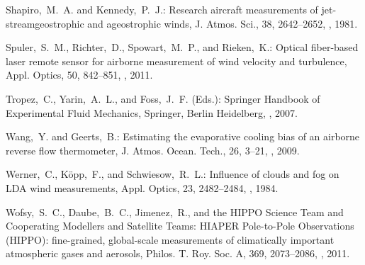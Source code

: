 \documentclass[amtd, online, hvmath]{copernicus}
\begin{document}
\begin{thebibliography}{30}
Shapiro,~M.~A. and Kennedy,~P.~J.: {Research aircraft measurements of jet-streamgeostrophic
and ageostrophic winds}, {J. Atmos. Sci.}, {38}, {2642--2652}, , {1981}.


Spuler,~S.~M., Richter,~D., Spowart,~M.~P., and Rieken,~K.: {Optical fiber-based
laser remote sensor for airborne measurement of wind velocity and turbulence}, {Appl. Optics}, {50}, {842--851}, , {2011}.


Tropez,~C., Yarin,~A.~L., and Foss,~J.~F. (Eds.): {Springer Handbook of Experimental
Fluid Mechanics}, Springer, Berlin Heidelberg, , 2007.


Wang,~Y. and Geerts,~B.: {Estimating the evaporative cooling bias of an airborne
reverse flow thermometer}, {J. Atmos. Ocean. Tech.}, {26}, {3--21}, , {2009}.


Werner,~C., K{\"o}pp,~F., and Schwiesow,~R.~L.: {Influence of clouds and fog
on LDA wind measurements}, Appl. Optics, 23, 2482--2484, , 1984.


Wofsy,~S.~C., Daube,~B.~C., Jimenez,~R., and {the HIPPO Science Team
  and Cooperating Modellers and Satellite Teams}: {HIAPER Pole-to-Pole
  Observations (HIPPO): fine-grained, global-scale measurements of
  climatically important atmospheric gases and aerosols},
Philos. T. Roy. Soc. A, 369, 2073--2086, , 2011.

\end{thebibliography}
\end{document}
